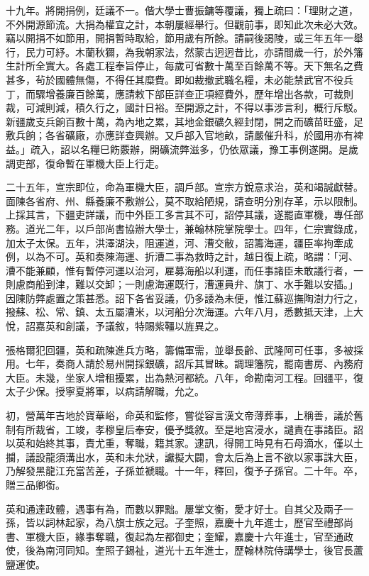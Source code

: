 \begin{pinyinscope}
十九年。將開捐例，廷議不一。偕大學士曹振鏞等覆議，獨上疏曰：「理財之道，不外開源節流。大捐為權宜之計，本朝屢經舉行。但觀前事，即知此次未必大效。竊以開捐不如節用，開捐暫時取給，節用歲有所餘。請嗣後謁陵，或三年五年一舉行，民力可紓。木蘭秋獮，為我朝家法，然蒙古迥迥昔比，亦請間歲一行，於外籓生計所全實大。各處工程奉旨停止，每歲可省數十萬至百餘萬不等。天下無名之費甚多，茍於國體無傷，不得任其糜費。即如裁撤武職名糧，未必能禁武官不役兵丁，而驟增養廉百餘萬，應請敕下部臣詳查正項經費外，歷年增出各款，可裁則裁，可減則減，積久行之，國計日裕。至開源之計，不得以事涉言利，概行斥駁。新疆歲支兵餉百數十萬，為內地之累，其地金銀礦久經封閉，開之而礦苗旺盛，足敷兵餉；各省礦廠，亦應詳查興辦。又戶部入官地畝，請嚴催升科，於國用亦有裨益。」疏入，詔以名糧巳飭覈辦，開礦流弊滋多，仍依眾議，豫工事例遂開。是歲調吏部，復命暫在軍機大臣上行走。

二十五年，宣宗即位，命為軍機大臣，調戶部。宣宗方銳意求治，英和竭誠獻替。面陳各省府、州、縣養廉不敷辦公，莫不取給陋規，請查明分別存革，示以限制。上採其言，下疆吏詳議，而中外臣工多言其不可，詔停其議，遂罷直軍機，專任部務。道光二年，以戶部尚書協辦大學士，兼翰林院掌院學士。四年，仁宗實錄成，加太子太保。五年，洪澤湖決，阻運道，河、漕交敝，詔籌海運，疆臣率拘牽成例，以為不可。英和奏陳海運、折漕二事為救時之計，越日復上疏，略謂：「河、漕不能兼顧，惟有暫停河運以治河，雇募海船以利運，而任事諸臣未敢議行者，一則慮商船到津，難以交卸；一則慮海運既行，漕運員弁、旗丁、水手難以安插。」因陳防弊處置之策甚悉。詔下各省妥議，仍多諉為未便，惟江蘇巡撫陶澍力行之，撥蘇、松、常、鎮、太五屬漕米，以河船分次海運。六年八月，悉數抵天津，上大悅，詔嘉英和創議，予議敘，特賜紫韁以旌異之。

張格爾犯回疆，英和疏陳進兵方略，籌備軍需，並舉長齡、武隆阿可任事，多被採用。七年，奏商人請於易州開採銀礦，詔斥其冒昧。調理籓院，罷南書房、內務府大臣。未幾，坐家人增租擾累，出為熱河都統。八年，命勘南河工程。回疆平，復太子少保。授寧夏將軍，以病請解職，允之。

初，營萬年吉地於寶華峪，命英和監修，嘗從容言漢文帝薄葬事，上稱善，議於舊制有所裁省，工竣，孝穆皇后奉安，優予獎敘。至是地宮浸水，譴責在事諸臣。詔以英和始終其事，責尤重，奪職，籍其家。逮訊，得開工時見有石母滴水，僅以土攔，議設龍須溝出水，英和未允狀，讞擬大闢，會太后為上言不欲以家事誅大臣，乃解發黑龍江充當苦差，子孫並褫職。十一年，釋回，復予子孫官。二十年。卒，贈三品卿銜。

英和通達政體，遇事有為，而數以罪黜。屢掌文衡，愛才好士。自其父及兩子一孫，皆以詞林起家，為八旗士族之冠。子奎照，嘉慶十九年進士，歷官至禮部尚書、軍機大臣，緣事奪職，復起為左都御史；奎耀，嘉慶十六年進士，官至通政使，後為南河同知。奎照子錫祉，道光十五年進士，歷翰林院侍講學士，後官長蘆鹽運使。


\end{pinyinscope}
